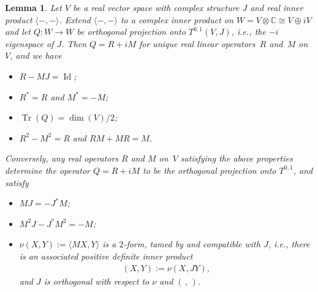 \documentclass[pdftex]{sigma}
\DeclareMathOperator{\Tr}{Tr}
\newtheorem{lem}[thm]{Lemma}
\numberwithin{equation}{section}
\newcommand{\CC}{\mathbb{C}}
\begin{document}
\begin{lem} \label{lem;JRM} Let $V$ be a real vector space with complex structure $J$ and real inner product $\langle - ,- \rangle$. Extend $\langle - ,- \rangle$ to a complex inner product on $W = V \otimes \CC \cong V \oplus i V$ and let $Q\colon W \to W$ be orthogonal projection onto $T^{0,1}(V,J)$, i.e., the $-i$ eigenspace of $J$. Then $Q = R + i M$ for unique real linear operators~$R$ and~$M$ on~$V$, and we have
\begin{itemize}\itemsep=0pt
\item[$(1)$] $R-MJ= \operatorname{Id}$;
\item[$(2)$] $R^* = R$ and $M^* = -M$;
\item[$(3)$] $\Tr(Q) = \dim(V)/2$;
\item[$(4)$] $R^2-M^2 = R$ and $RM+MR= M$.
\end{itemize}
Conversely, any real operators $R$ and $M$ on~$V$ satisfying the above properties determine the operator $Q=R+iM$ to be the orthogonal projection onto $T^{0,1}$, and satisfy
\begin{itemize}\itemsep=0pt
\item[$(a)$] $MJ= - J^*M$;
\item[$(b)$] $ M^2J-J^*M^2 = -M$;
\item[$(c)$] $\nu(X,Y) := \langle M X,Y\rangle$ is a $2$-form, tamed by and compatible with $J$, i.e., there is an associated positive definite inner product
\begin{gather*}
(X,Y) := \nu(X,JY),
\end{gather*}
and $J$ is orthogonal with respect to $\nu$ and $( \, , \, )$.
\end{itemize}
\end{lem}
\end{document}
